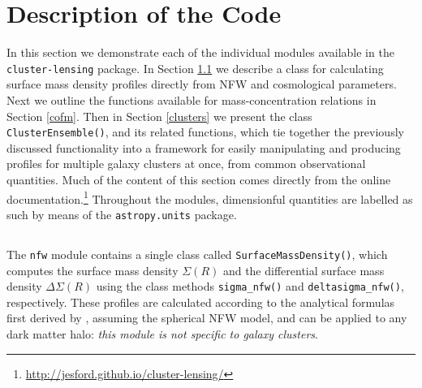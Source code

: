 \documentclass[twocolumn]{aastex6}
\newcommand{\code}{\lstinline[style=codeintext]}
\newcommand{\hcode}{\large\normalfont\texttt} %
\begin{document}

\section{Description of the Code}
\label{code}

In this section we demonstrate each of the individual modules available in the \code{cluster-lensing} package. In Section \ref{nfw} we describe a class for calculating surface mass density profiles directly from NFW and cosmological parameters. Next we outline the functions available for mass-concentration relations in Section \ref{cofm}. Then in Section \ref{clusters} we present the class \code{ClusterEnsemble()}, and its related functions, which tie together the previously discussed functionality into a framework for easily manipulating and producing profiles for multiple galaxy clusters at once, from common observational quantities. Much of the content of this section comes directly from the online documentation.\footnote{\url{http://jesford.github.io/cluster-lensing/}} Throughout the modules, dimensionful quantities are labelled as such by means of the \code{astropy.units} package.


\subsection{\normalfont{\hcode{nfw}}}
\label{nfw}

The \code{nfw} module contains a single class called \code{SurfaceMassDensity()}, which computes the surface mass density $\Sigma(R)$ and the differential surface mass density $\Delta\Sigma(R)$ using the class methods \code{sigma_nfw()} and \code{deltasigma_nfw()}, respectively. These profiles are calculated according to the analytical formulas first derived by \citet{Wright00}, assuming the spherical NFW model, and can be applied to any dark matter halo: \emph{this module is not specific to galaxy clusters}.
\end{document}
